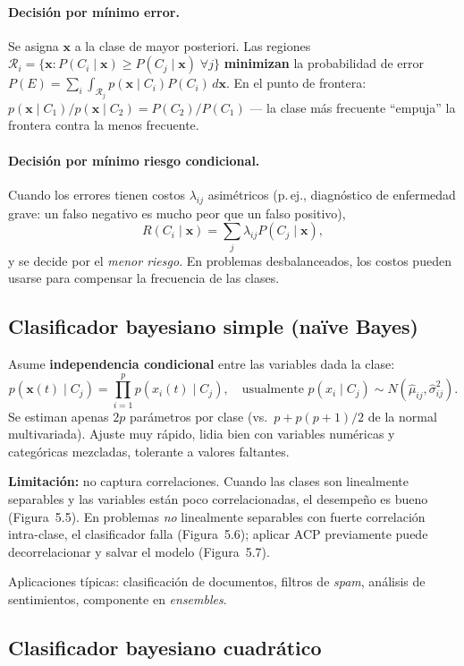 \paragraph{Decisión por mínimo error.}
Se asigna $\mathbf{x}$ a la clase de mayor posteriori. Las regiones
$\mathcal{R}_i=\{\mathbf{x}:P(C_i\mid\mathbf{x})\geq P(C_j\mid\mathbf{x})\;\forall j\}$
\textbf{minimizan} la probabilidad de error
$P(E)=\sum_i\int_{\mathcal{R}_j}p(\mathbf{x}\mid C_i)P(C_i)\,d\mathbf{x}$.
En el punto de frontera:
$p(\mathbf{x}\mid C_1)/p(\mathbf{x}\mid C_2)=P(C_2)/P(C_1)$ --- la
clase más frecuente ``empuja'' la frontera contra la menos frecuente.

\paragraph{Decisión por mínimo riesgo condicional.}
Cuando los errores tienen costos $\lambda_{ij}$ asimétricos (p.\,ej.,
diagnóstico de enfermedad grave: un falso negativo es mucho peor que
un falso positivo),
\[
R(C_i\mid\mathbf{x})=\sum_{j}\lambda_{ij}P(C_j\mid\mathbf{x}),
\]
y se decide por el \emph{menor riesgo}. En problemas desbalanceados,
los costos pueden usarse para compensar la frecuencia de las clases.

\subsection{Clasificador bayesiano simple (naïve Bayes)}

Asume \textbf{independencia condicional} entre las variables dada la
clase:
\[
p(\mathbf{x}(t)\mid C_j)=\prod_{i=1}^{p}p(x_i(t)\mid C_j),
\quad\text{usualmente }p(x_i\mid C_j)\sim N(\hat\mu_{ij},\hat\sigma_{ij}^2).
\]
Se estiman apenas $2p$ parámetros por clase (vs.\ $p+p(p+1)/2$ de la
normal multivariada). Ajuste muy rápido, lidia bien con variables
numéricas y categóricas mezcladas, tolerante a valores faltantes.

\textbf{Limitación:} no captura correlaciones. Cuando las clases son
linealmente separables y las variables están poco correlacionadas, el
desempeño es bueno (Figura~5.5). En problemas \emph{no} linealmente
separables con fuerte correlación intra-clase, el clasificador falla
(Figura~5.6); aplicar ACP previamente puede decorrelacionar y salvar
el modelo (Figura~5.7).

Aplicaciones típicas: clasificación de documentos, filtros de
\emph{spam}, análisis de sentimientos, componente en \emph{ensembles}.

\subsection{Clasificador bayesiano cuadrático}

